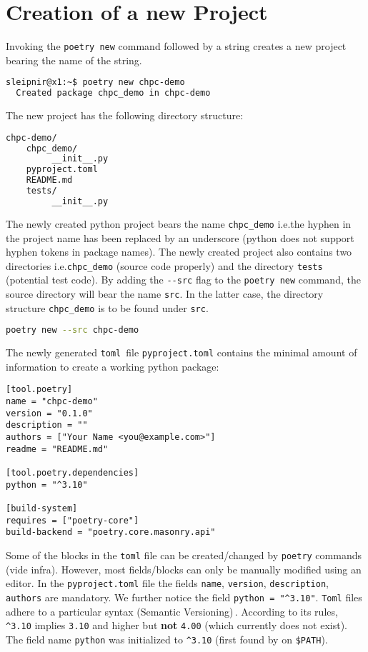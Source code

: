 \documentclass[10pt]{article}
\begin{document}
\section{Creation of a new Project}
Invoking the \lstinline[language=bash]{poetry new} command followed by a string creates a new project bearing the name of the string.
\begin{lstlisting}[language=bash]
sleipnir@x1:~$ poetry new chpc-demo
  Created package chpc_demo in chpc-demo
\end{lstlisting}
The new project has the following directory structure:
\begin{lstlisting}[language=bash]
chpc-demo/
    chpc_demo/
         __init__.py
    pyproject.toml
    README.md
    tests/
         __init__.py
\end{lstlisting}
The newly created python project bears the name \texttt{chpc\_demo} i.e.\;the hyphen in the project name has been 
replaced by an underscore (python does not support hyphen tokens in package names).
The newly created project also contains two directories i.e.\;\texttt{chpc\_demo} (source code properly) and 
the directory \texttt{tests} (potential test code). By adding the \lstinline[language=bash]{--src} flag to the 
\lstinline[language=bash]{poetry new} command, the source directory will bear the name \texttt{src}. 
In the latter case, the directory structure \texttt{chpc\_demo} is to be found 
under \texttt{src}. 
\begin{lstlisting}[language=bash]
poetry new --src chpc-demo
\end{lstlisting}
The newly generated \texttt{toml}\,\cite{TOML:2023} file \texttt{pyproject.toml} contains the minimal amount of information to create a working python package:
\begin{verbatim}
[tool.poetry]
name = "chpc-demo"
version = "0.1.0"
description = ""
authors = ["Your Name <you@example.com>"]
readme = "README.md"

[tool.poetry.dependencies]
python = "^3.10"

[build-system]
requires = ["poetry-core"]
build-backend = "poetry.core.masonry.api"
\end{verbatim}	
Some of the blocks in the \texttt{toml} file can be created/changed by
\texttt{poetry} commands (vide infra). However, most fields/blocks can only be manually modified using an editor. 
In the \texttt{pyproject.toml} file the fields \texttt{name}, \texttt{version}, \texttt{description}, \texttt{authors} are mandatory.
We further notice the field \texttt{python = "\textasciicircum3.10"}. \texttt{Toml} files adhere to a particular syntax (Semantic Versioning)\,\cite{SEMANVER:2023}.
According to its rules, 
\texttt{\textasciicircum3.10} implies \texttt{3.10} and higher but \textbf{not} \texttt{4.00} (which currently does not exist). 
The field name \texttt{python} was initialized to \texttt{\textasciicircum3.10} (first found by on \texttt{\$PATH}).
\end{document}

